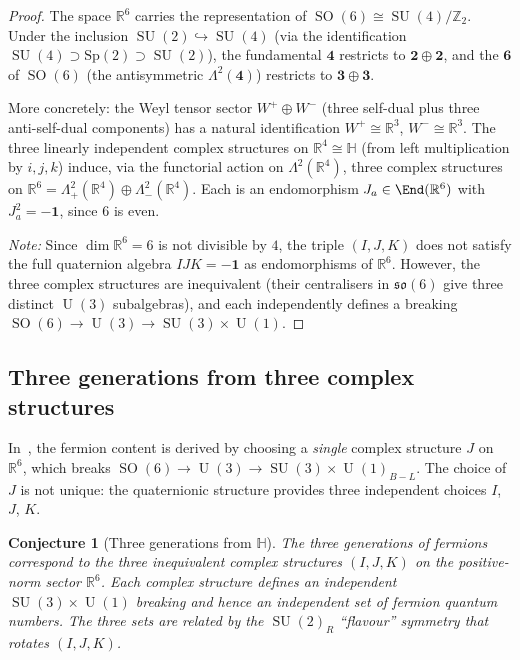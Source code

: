 \documentclass[12pt,a4paper]{article}
\newtheorem{conjecture}[theorem]{Conjecture}
\theoremstyle{definition}
\newcommand{\SO}{\operatorname{SO}}
\newcommand{\SU}{\operatorname{SU}}
\newcommand{\U}{\operatorname{U}}
\newcommand{\R}{\mathbb{R}}
\newcommand{\Z}{\mathbb{Z}}
\newcommand{\HH}{\mathbb{H}}
\begin{document}
\begin{proof}
The space $\R^6$ carries the representation of $\SO(6) \cong \SU(4)/\Z_2$.
Under the inclusion $\SU(2) \hookrightarrow \SU(4)$ (via the identification $\SU(4) \supset \mathrm{Sp}(2) \supset \SU(2)$), the fundamental $\mathbf{4}$ restricts to $\mathbf{2} \oplus \mathbf{2}$, and the $\mathbf{6}$ of $\SO(6)$ (the antisymmetric $\Lambda^2(\mathbf{4})$) restricts to $\mathbf{3} \oplus \mathbf{3}$.

More concretely: the Weyl tensor sector $W^+ \oplus W^-$ (three self-dual plus three anti-self-dual components) has a natural identification $W^+ \cong \R^3$, $W^- \cong \R^3$.
The three linearly independent complex structures on $\R^4 \cong \HH$ (from left multiplication by $i, j, k$) induce, via the functorial action on $\Lambda^2(\R^4)$, three complex structures on $\R^6 = \Lambda^2_+(\R^4) \oplus \Lambda^2_-(\R^4)$.
Each is an endomorphism $J_a \in \End(\R^6)$ with $J_a^2 = -\mathbf{1}$, since $6$ is even.

\emph{Note:} Since $\dim \R^6 = 6$ is not divisible by $4$, the triple $(I,J,K)$ does not satisfy the full quaternion algebra $IJK = -\mathbf{1}$ as endomorphisms of $\R^6$.
However, the three complex structures are inequivalent (their centralisers in $\mathfrak{so}(6)$ give three distinct $\U(3)$ subalgebras), and each independently defines a breaking $\SO(6) \to \U(3) \to \SU(3) \times \U(1)$.
\end{proof}

\subsection{Three generations from three complex structures}

In~\cite{Paper2}, the fermion content is derived by choosing a \emph{single} complex structure $J$ on $\R^6$, which breaks $\SO(6) \to \U(3) \to \SU(3) \times \U(1)_{B-L}$.
The choice of $J$ is not unique: the quaternionic structure provides three independent choices $I$, $J$, $K$.

\begin{conjecture}[Three generations from $\HH$]
\label{conj:three_gen}
The three generations of fermions correspond to the three inequivalent complex structures $(I, J, K)$ on the positive-norm sector $\R^6$.
Each complex structure defines an independent $\SU(3) \times \U(1)$ breaking and hence an independent set of fermion quantum numbers.
The three sets are related by the $\SU(2)_R$ ``flavour'' symmetry that rotates $(I, J, K)$.
\end{conjecture}
\end{document}
